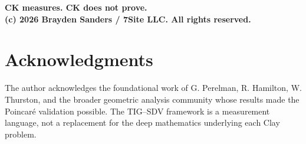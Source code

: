 \documentclass[11pt]{article}
\begin{document}
\medskip
\noindent
\textbf{CK measures.  CK does not prove.}\\
\textbf{(c) 2026 Brayden Sanders / 7Site LLC.  All rights reserved.}

\section*{Acknowledgments}

The author acknowledges the foundational work of G. Perelman,
R. Hamilton, W. Thurston, and the broader geometric analysis community
whose results made the Poincar\'e validation possible.  The TIG--SDV
framework is a measurement language, not a replacement for the deep
mathematics underlying each Clay problem.
\end{document}
